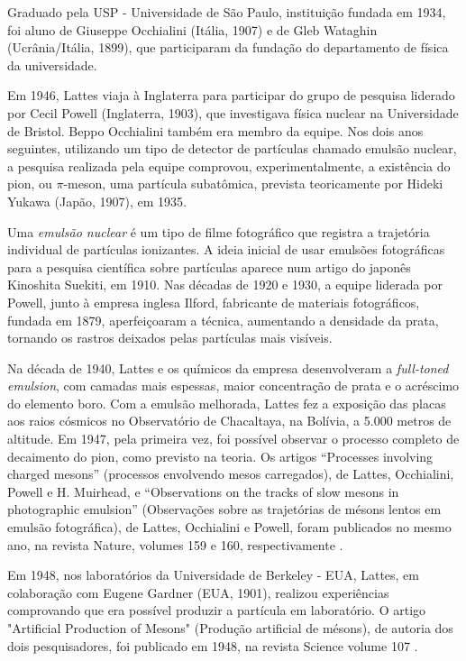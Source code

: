 \documentclass{hipatia}
\begin{document}
Graduado pela USP - Universidade de São Paulo, instituição fundada em 1934, foi aluno de Giuseppe Occhialini (Itália, 1907) e de Gleb Wataghin (Ucrânia/Itália, 1899), que participaram da fundação do departamento de física da universidade.

Em 1946, Lattes viaja à Inglaterra para participar do grupo de pesquisa liderado por Cecil Powell (Inglaterra, 1903), que investigava física nuclear na Universidade de Bristol. Beppo Occhialini também era membro da equipe. Nos dois anos seguintes, utilizando um tipo de detector de partículas chamado emulsão nuclear, a pesquisa realizada pela equipe comprovou, experimentalmente, a existência do pion, ou $\pi$-meson, uma partícula subatômica, prevista teoricamente por Hideki Yukawa (Japão, 1907), em 1935.

Uma \textit{emulsão nuclear} é um tipo de filme fotográfico que registra a trajetória individual de partículas ionizantes. A ideia inicial de usar emulsões fotográficas para a pesquisa científica sobre partículas aparece num artigo do japonês Kinoshita Suekiti, em 1910. Nas décadas de 1920 e 1930, a equipe liderada por Powell, junto à empresa inglesa Ilford, fabricante de materiais fotográficos, fundada em 1879, aperfeiçoaram a técnica, aumentando a densidade da prata, tornando os rastros deixados pelas partículas mais visíveis. 

Na década de 1940, Lattes e os químicos da empresa desenvolveram a \textit{full-toned emulsion}, com camadas mais espessas, maior concentração de prata e o acréscimo do elemento boro. Com a emulsão melhorada, Lattes fez a exposição das placas aos raios cósmicos no Observatório de Chacaltaya, na Bolívia, a 5.000 metros de altitude. Em 1947, pela primeira vez, foi possível observar o processo completo de decaimento do pion, como previsto na teoria. Os artigos ``Processes involving charged mesons'' (processos envolvendo mesos carregados), de Lattes, Occhialini, Powell e H. Muirhead, e  ``Observations on the tracks of slow mesons in photographic emulsion'' (Observações sobre as trajetórias de mésons lentos em emulsão fotográfica), de Lattes, Occhialini e Powell, foram publicados no mesmo ano, na revista Nature, volumes 159 e 160, respectivamente 	\cite{Lattes1947Nature1} 	\cite{Lattes1947Nature2}.

Em 1948, nos laboratórios da Universidade de Berkeley - EUA, Lattes, em colaboração com Eugene Gardner (EUA, 1901), realizou experiências comprovando que era possível produzir a partícula em laboratório. O artigo "Artificial Production of Mesons" (Produção artificial de mésons), de autoria dos dois pesquisadores, foi publicado em 1948, na revista Science volume 107 \cite{Gardner1948}.
\end{document}
